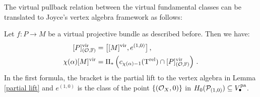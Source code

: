 \documentclass[a4paper, 12pt]{amsart}
\begin{document}
The virtual pullback relation between the virtual fundamental classes can be translated to Joyce's vertex algebra framework as follows:
\begin{proposition}\label{thm: projectivebundleformula}
Let $f\colon P\to M$ be a virtual projective bundle as described before. Then we have:
\begin{align}
\label{eq: projectivebundlebracket}[P]^{\mathrm{vir}}_{({\mathcal O},{\mathbb{F}})}&=\big[[M]^{\mathrm{vir}}, e^{(1,0)}\big]\,,\\
\label{eq: projectivebundleupsilon}\chi(\alpha)[M]^{\mathrm{vir}}&=\Pi_\ast\left(c_{\chi(\alpha)-1}(\mathrm{T}^{\rm rel})\cap [P]^{\mathrm{vir}}_{({\mathcal O},{\mathbb{F}})}\right)\,.
\end{align}
In the first formula, the bracket is the partial lift to the vertex algebra in Lemma \ref{partial lift} and $e^{(1,0)}$ is the class of the point $\{({\mathcal O}_X, 0)\}$ in $H_0({\mathcal P}_{(1, 0)})\subseteq V_\bullet^{\mathop{\rm pa}\nolimits}$.
\end{proposition}
\end{document}
